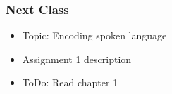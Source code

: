 \documentclass{beamer}
\begin{document}
\begin{frame}
\frametitle{Next Class}
\begin{itemize}
\item Topic: Encoding spoken language
\item Assignment 1 description 
\item ToDo: Read chapter 1
\end{itemize}
\end{frame}

\end{document}
